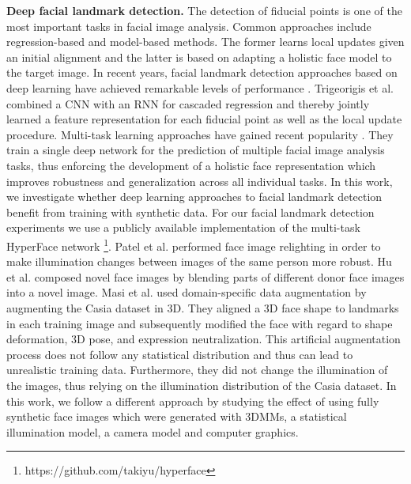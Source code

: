 \documentclass[10pt,twocolumn,letterpaper]{article}
\begin{document}
    \textbf{Deep facial landmark detection.} 
	The detection of fiducial  points is one of the most important tasks in facial image analysis. Common approaches include regression-based \cite{xiong2013supervised,cao2014face,kazemi2014one} and model-based \cite{cootes1995active,matthews2004active} methods. The former learns local updates given an initial alignment and the latter is based on adapting a holistic face model to the target image. In recent years, facial landmark detection approaches based on deep learning have achieved remarkable levels of performance \cite{sun2013deep}. Trigeorigis et al. \cite{trigeorgis2016mnemonic} combined a CNN with an RNN for cascaded regression and thereby jointly learned a feature representation for each fiducial point as well as the local update procedure. Multi-task learning approaches have gained recent popularity \cite{zhang2014facial,ranjan2017all}. They train a single deep network for the prediction of multiple facial image analysis tasks, thus enforcing the development of a holistic face representation which improves robustness and generalization across all individual tasks.	In this work, we investigate whether deep learning approaches to facial landmark detection benefit from training with synthetic data. For our facial landmark detection experiments we use a publicly available implementation of the multi-task HyperFace network \footnote{https://github.com/takiyu/hyperface}.
    Patel et al. \cite{patel2011illumination} performed face image relighting in order to make illumination changes between images of the same person more robust. Hu et al. \cite{hu2018frankenstein} composed novel face images by blending parts of different donor face images into a novel image.
    Masi et al. \cite{masi2016we} used domain-specific data augmentation by augmenting the Casia dataset \cite{casia} in 3D. They aligned a 3D face shape to landmarks in each training image and subsequently modified the face with regard to shape deformation, 3D pose, and expression neutralization. This artificial augmentation process does not follow any statistical distribution and thus can lead to unrealistic training data. Furthermore, they did not change the illumination of the images, thus relying on the illumination distribution of the Casia dataset. In this work, we follow a different approach by studying the effect of using fully synthetic face images which were generated with 3DMMs, a statistical illumination model, a camera model and computer graphics.
    
\end{document}
